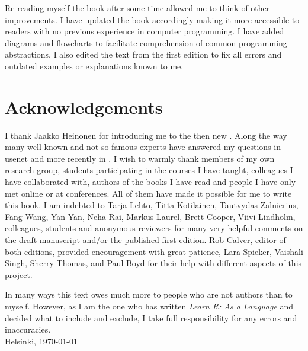 \documentclass[krantz2]{krantz}\usepackage{knitr}
\begin{document}
Re-reading myself the book after some time allowed me to think of other improvements. I have updated the book accordingly making it more accessible to readers with no previous experience in computer programming. I have added diagrams and flowcharts to facilitate comprehension of common programming abstractions. I also edited the text from the first edition to fix all errors and outdated examples or explanations known to me.

\section*{Acknowledgements}
I thank Jaakko Heinonen for introducing me to the then new \Rlang. Along the way many well known and not so famous experts have answered my questions in usenet and more recently in \stackoverflow. I wish to warmly thank members of my own research group, students participating in the courses I have taught, colleagues I have collaborated with, authors of the books I have read and people I have only met online or at conferences. All of them have made it possible for me to write this book. I am indebted to Tarja Lehto, Titta Kotilainen, Tautvydas Zalnierius, Fang Wang, Yan Yan, Neha Rai, Markus Laurel, Brett Cooper, Viivi Lindholm, colleagues, students and anonymous reviewers for many very helpful comments on the draft manuscript and/or the published first edition. Rob Calver, editor of both editions, provided encouragement with great patience, Lara Spieker, Vaishali Singh, Sherry Thomas, and Paul Boyd for their help with different aspects of this project.

In many ways this text owes much more to people who are not authors than to myself. However, as I am the one who has written \emph{Learn R: As a Language} and decided what to include and exclude, I take full responsibility for any errors and inaccuracies.
\\[1cm]

Helsinki, \today


\end{document}
